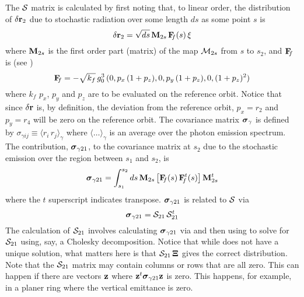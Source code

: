 The ${\cal S}$ matrix is calculated by first noting that, to linear order, the distribution of
$\delta{\bf r}_2$ due to stochastic radiation over some length $ds$ as some point $s$ is
\begin{equation}
  \delta{\bf r}_2 = \sqrt{ds} \, {\bf M}_{2s} \, {\bf F}_{\mkern-6 mu{f}}(s) \, \xi
\end{equation}
where ${\bf M}_{2s}$ is the first order part (matrix) of the map ${\cal M}_{2s}$ from $s$ to $s_2$, and
${\bf F}_{\mkern-6 mu{f}}$ is (see )
\begin{equation}
  {\bf F}_{\mkern-6 mu{f}} = -\sqrt{k_f} \, g_0^3 \, (0, p_x \, (1 + p_z), 0, p_y \, (1 + p_z), 0, (1 + p_z)^2)
  \label{fk000}
\end{equation}
where $k_f$ $p_x$, $p_y$ and $p_z$ are to be evaluated on the reference orbit. Notice that since
$\delta{\bf r}$ is, by definition, the deviation from the reference orbit, $p_x = r_2$ and $p_y = r_4$
will be zero on the reference orbit. The covariance matrix ${\boldsymbol{\sigma}}_\gamma$ is defined by
$\sigma_{\gamma ij} \equiv \langle r_i \, r_j \rangle_\gamma$ where $\langle \ldots \rangle_\gamma$
is an average over the photon emission spectrum. The contribution, ${\boldsymbol{\sigma}}_{\gamma21}$, to the
covariance matrix at $s_2$ due to the stochastic emission over the region between $s_1$ and $s_2$,
is
\begin{equation}
  {\boldsymbol{\sigma}}_{\gamma21} = \int_{s_1}^{s_2} ds \, 
  {\bf M}_{2s} \, \big[ {\bf F}_{\mkern-6 mu{f}}(s) \, {\bf F}_{\mkern-6 mu{f}}^t(s) \big] \, {\bf M}_{2s}^t
  \label{smvvm}
\end{equation}
where the $t$ superscript indicates transpose. ${\boldsymbol{\sigma}}_{\gamma21}$ is related to ${\cal S}$ via
\begin{equation}
  {\boldsymbol{\sigma}}_{\gamma21} = {\cal S}_{21} \, {\cal S}_{21}^t
  \label{sxx}
\end{equation}
The calculation of ${\cal S}_{21}$ involves calculating ${\boldsymbol{\sigma}}_{\gamma21}$ via  and then using
 to solve for ${\cal S}_{21}$ using, say, a Cholesky decomposition. Notice that while 
does not have a unique solution, what matters here is that ${\cal S}_{21} \, {\bf \Xi}$ gives the correct
distribution. Note that the ${\cal S}_{21}$ matrix may contain columns or rows that are all zero. This can
happen if there are vectors ${\bf z}$ where ${\bf z}^t {\boldsymbol{\sigma}}_{\gamma21} {\bf z}$ is zero. This happens,
for example, in a planer ring where the vertical emittance is zero.


